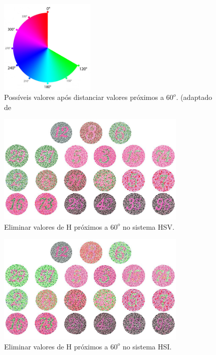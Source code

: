 \documentclass[	12pt, Times, openright, twoside, a4paper, english, brazil]{abntex2}
\begin{document}
\begin{figure}[!htb]
\centering \includegraphics[width=0.40\textwidth]{figuraColorsHamarelo.PNG}
\caption{Possíveis valores após distanciar valores próximos a $60^o$. (adaptado de }
\label{fig:figuraColorsHamarelo}
\end{figure}

\begin{figure}[!htb]
\centering \includegraphics[width=0.80\textwidth]{figuraDeslocarAzulHSV.jpg}
\caption{Eliminar valores de H próximos a $60^o$ no sistema HSV.}
\label{fig:reduzirHamarelo}
\end{figure}

\begin{figure}[!htb]
\centering \includegraphics[width=0.80\textwidth]{figuraDeslocarAzulHSI.jpg}
\caption{Eliminar valores de H próximos a $60^o$ no sistema HSI.}
\label{fig:reduzirHamareloHSI}
\end{figure}
\end{document}
